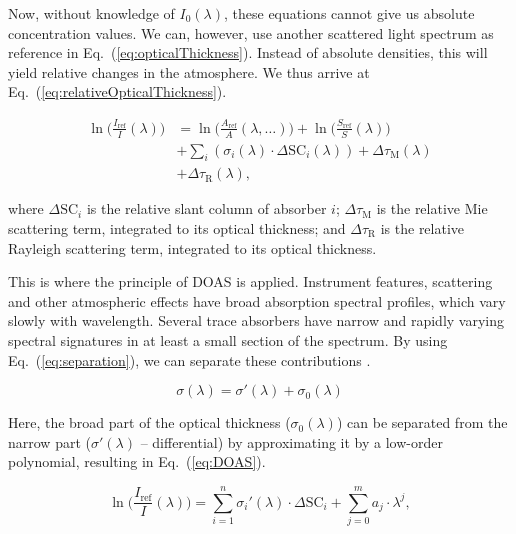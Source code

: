 Now, without knowledge of $I_{0}(\lambda)$, these equations cannot give
us absolute concentration values. We can, however, use another scattered
light spectrum as reference in Eq.~(\ref{eq:opticalThickness}). Instead
of absolute densities, this will yield relative changes in the
atmosphere. We thus arrive at Eq.~(\ref{eq:relativeOpticalThickness}).

\begin{align}
      \label{eq:relativeOpticalThickness}
      \ln\Big( \frac{I_\mathrm{ref}}{I}(\lambda) \Big) &= \ln\Big( \frac{A_\mathrm{ref}}{A}(\lambda,\ldots) \Big) + \ln\Big( \frac{S_\mathrm{ref}}{S}(\lambda) \Big) \nonumber\\
      &+  \sum_{i} (\sigma_{i}(\lambda) \cdot \Delta \mathrm{SC}_{i}(\lambda)) + \Delta \tau_\mathrm{M}(\lambda) \nonumber\\
      &+ \Delta \tau_\mathrm{R}(\lambda),
\end{align}

where $\Delta \mathrm{SC}_{i}$  is the relative slant column of absorber
$i$; $\Delta \tau_\mathrm{M}$  is the relative Mie scattering term,
integrated to its optical thickness; and $\Delta \tau_\mathrm{R}$ is the
relative Rayleigh scattering term, integrated to its optical thickness.


This is where the principle of DOAS is applied. Instrument features,
scattering and other atmospheric effects have broad absorption spectral
profiles, which vary slowly with wavelength. Several trace absorbers
have narrow and rapidly varying spectral signatures in at least a small
section of the spectrum. By using Eq.~(\ref{eq:separation}), we can
separate these contributions \cite{Danckaert2015}.

\begin{equation}
      \label{eq:separation}
      \sigma(\lambda) = \sigma{'}(\lambda) + \sigma_{0}(\lambda)
\end{equation}

Here, the broad part of the optical thickness ($\sigma_{0}(\lambda)$)
can be separated from the narrow part ($\sigma{'}(\lambda)$ --
differential) by approximating it by a low-order polynomial, resulting
in Eq.~(\ref{eq:DOAS}).

\begin{equation}
      \label{eq:DOAS}
      \ln\Big( \frac{I_\mathrm{ref}}{I}(\lambda) \Big) = \sum_{i = 1}^{n} \sigma_{i}{'}(\lambda) \cdot \Delta \mathrm{SC}_{i} + \sum_{j = 0}^{m} a_{j} \cdot
      \lambda^{j},
\end{equation}


